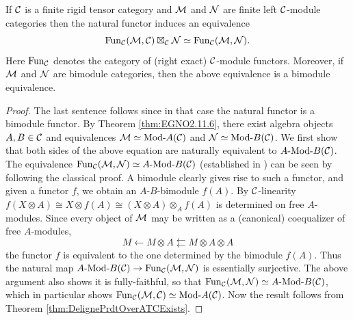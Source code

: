 \documentclass{amsart}
\begin{document}
\begin{lemma} \label{Lma:FunctorsAsATensorPdt}
	If $\mathcal C$ is a finite rigid tensor category and $\mathcal M$ and $\mathcal N$ are finite left $\mathcal C$-module categories then the natural functor induces an equivalence
	\begin{equation*}
		\operatorname{Fun}_\mathcal C(\mathcal M, \mathcal C) \boxtimes_\mathcal C \mathcal N \simeq \operatorname{Fun}_\mathcal C(\mathcal M,\mathcal N).
	\end{equation*}
	Here $\operatorname{Fun}_\mathcal C$ denotes the category of (right exact) $\mathcal C$-module functors. 
	Moreover, if $\mathcal M$ and $\mathcal N$ are bimodule categories, then the above equivalence is a bimodule equivalence. 
\end{lemma}

\begin{proof}
	The last sentence follows since in that case the natural functor is a bimodule functor. By Theorem \ref{thm:EGNO2.11.6}, there exist algebra objects $A, B \in \mathcal C$ and equivalences $\cM \simeq \Mod{}{A}(\cC)$ and $\cN \simeq \Mod{}{B}(\cC)$. We first show that both sides of the above equation are naturally equivalent to $\Mod{A}{B}(\cC)$. The equivalence $\Fun_\cC(\cM, \cN) \simeq \Mod{A}{B}(\cC)$ (established in \cite[Prop 2.12.2]{EGNO}) can be seen by following the classical proof. A bimodule clearly gives rise to such a functor, and given a functor $f$, we obtain an $A$-$B$-bimodule $f(A)$. By $\mathcal C$-linearity $f(X \otimes A) \cong X \otimes f(A)  \cong (X \otimes A) \otimes_A f(A) $ is determined on free $A$-modules. Since every object of $\mathcal M$ may be written as a (canonical) coequalizer of free $A$-modules,
	\begin{equation*}
		M \leftarrow M \otimes A \leftleftarrows M \otimes A \otimes A
	\end{equation*} 
the functor $f$ is equivalent to the one determined by the bimodule $f(A)$. Thus the natural map  $\Mod{A}{B}(\cC) \to \Fun_\cC(\cM, \cN)$ is essentially surjective. The above argument also shows it is fully-faithful, so that $\Fun_\cC(\cM, \cN) \simeq \Mod{A}{B}(\cC)$, which in particular shows $\Fun_\cC(\cM, \cC) \simeq \Mod{}{A}(\cC)$. Now the result follows from Theorem \ref{thm:DelignePrdtOverATCExists}.

\end{proof}
\end{document}
